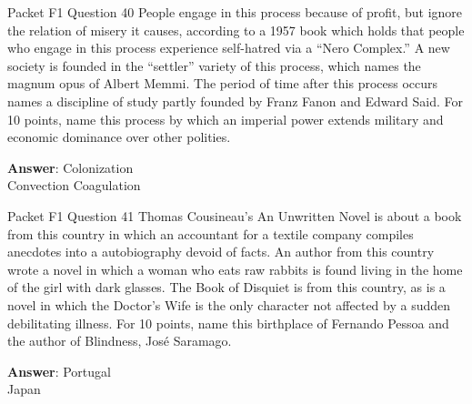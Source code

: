 \begin{frame}{Packet F1 Question 40}
People engage in this process because of profit, but ignore the relation of misery it causes, according to a 1957 book which holds that people who engage in this process experience self-hatred via a “Nero Complex.” A new society is founded in the “settler” variety of this process, which names the magnum opus of Albert Memmi. The period of time after this process occurs names a discipline   of study partly founded by Franz Fanon and Edward Said. For 10 points, name this process by which an imperial power   extends military   and economic dominance over other polities.  

\textbf{Answer}: Colonization\\
 Convection
 Coagulation
\end{frame}

\begin{frame}{Packet F1 Question 41}
Thomas Cousineau’s An Unwritten Novel is about a book from this country in which an accountant for a textile company compiles anecdotes into a autobiography devoid of facts. An author from this country wrote a novel in which a woman who eats raw rabbits is found living in the home of the girl with dark glasses. The Book of Disquiet is from   this country, as is a novel in which the Doctor’s Wife is the only character not affected by a sudden debilitating illness. For 10 points, name this birthplace of Fernando Pessoa and     the author of Blindness, José Saramago.  

\textbf{Answer}: Portugal\\
 Japan
\end{frame}

